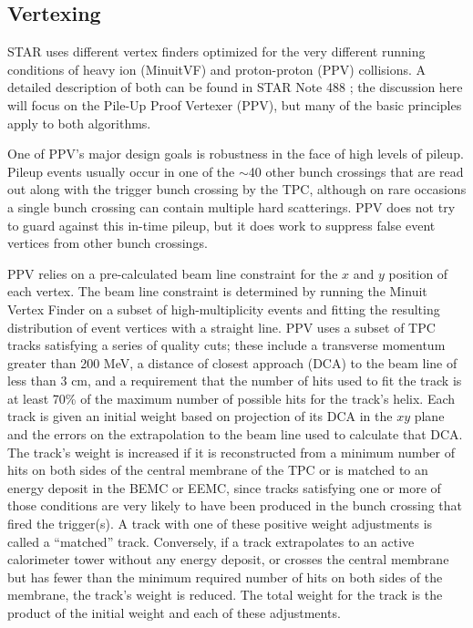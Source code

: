 \subsection{Vertexing}

STAR uses different vertex finders optimized for the very different running conditions of heavy ion (MinuitVF) and proton-proton (PPV) collisions.  A detailed description of both can be found in STAR Note 488 \cite{vertex-finder-starnote}; the discussion here will focus on the Pile-Up Proof Vertexer (PPV), but many of the basic principles apply to both algorithms.  

One of PPV's major design goals is robustness in the face of high levels of pileup.  Pileup events usually occur in one of the $\sim$40 other bunch crossings that are read out along with the trigger bunch crossing by the TPC, although on rare occasions a single bunch crossing can contain multiple hard scatterings.  PPV does not try to guard against this in-time pileup, but it does work to suppress false event vertices from other bunch crossings.

PPV relies on a pre-calculated beam line constraint for the $x$ and $y$ position of each vertex.  The beam line constraint is determined by running the Minuit Vertex Finder on a subset of high-multiplicity events and fitting the resulting distribution of event vertices with a straight line.  PPV uses a subset of TPC tracks satisfying a series of quality cuts; these include a transverse momentum greater than 200 MeV, a distance of closest approach (DCA) to the beam line of less than 3 cm, and a requirement that the number of hits used to fit the track is at least 70\% of the maximum number of possible hits for the track's helix.  Each track is given an initial weight based on projection of its DCA in the $xy$ plane and the errors on the extrapolation to the beam line used to calculate that DCA.  The track's weight is increased if it is reconstructed from a minimum number of hits on both sides of the central membrane of the TPC or is matched to an energy deposit in the BEMC or EEMC, since tracks satisfying one or more of those conditions are very likely to have been produced in the bunch crossing that fired the trigger(s). A track with one of these positive weight adjustments is called a ``matched'' track. Conversely, if a track extrapolates to an active calorimeter tower without any energy deposit, or crosses the central membrane but has fewer than the minimum required number of hits on both sides of the membrane, the track's weight is reduced.  The total weight for the track is the product of the initial weight and each of these adjustments.

